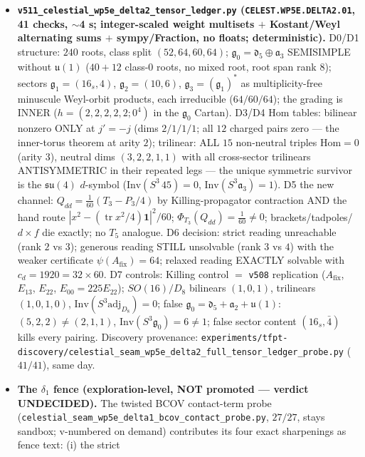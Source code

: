 \documentclass[11pt]{article}
\begin{document}
\begin{itemize}[leftmargin=1.5em]
\item \textbf{\texttt{v511\_celestial\_wp5e\_delta2\_tensor\_ledger.py} (\texttt{CELEST.WP5E.DELTA2.01},
41 checks, $\sim$4 s; integer-scaled weight multisets $+$ Kostant/Weyl alternating sums $+$
sympy/Fraction, no floats; deterministic).} D0/D1 structure: $240$ roots, class split
$(52,64,60,64)$; $\mathfrak g_0=\mathfrak d_5\oplus\mathfrak a_3$ SEMISIMPLE without
$\mathfrak u(1)$ ($40{+}12$ class-$0$ roots, no mixed root, root span rank $8$); sectors
$\mathfrak g_1=(16_s,4)$, $\mathfrak g_2=(10,6)$, $\mathfrak g_3=(\mathfrak g_1)^*$ as
multiplicity-free minuscule Weyl-orbit products, each irreducible ($64/60/64$); the grading is
INNER ($h=(2,2,2,2,2;0^4)$ in the $\mathfrak g_0$ Cartan). D3/D4 Hom tables: bilinear nonzero
ONLY at $j'=-j$ (dims $2/1/1/1$; all $12$ charged pairs zero --- the inner-torus theorem at
arity $2$); trilinear: ALL $15$ non-neutral triples $\mathrm{Hom}=0$ (arity $3$), neutral dims
$(3,2,2,1,1)$ with all cross-sector trilinears ANTISYMMETRIC in their repeated legs --- the
unique symmetric survivor is the $\mathfrak{su}(4)$ $d$-symbol ($\mathrm{Inv}(S^3\,45)=0$,
$\mathrm{Inv}(S^3\mathfrak a_3)=1$). D5 the new channel: $Q_{dd}=\tfrac1{60}(T_3-P_3/4)$ by
Killing-propagator contraction AND the hand route $|x^2-(\operatorname{tr}x^2/4)\mathbf 1|^2/60$;
$\Phi_{T_3}(Q_{dd})=\tfrac1{60}\neq0$; brackets/tadpoles/$d{\times}f$ die exactly; no $T_5$
analogue. D6 decision: strict reading unreachable (rank $2$ vs $3$); generous reading STILL
unsolvable (rank $3$ vs $4$) with the weaker certificate $\psi(A_{\mathrm{fix}})=64$; relaxed
reading EXACTLY solvable with $c_d=1920=32\times60$. D7 controls: Killing control $=$
\texttt{v508} replication ($A_{\mathrm{fix}}$, $E_{13}$, $E_{22}$, $E_{00}=225E_{22}$);
$SO(16)/D_8$ bilinears $(1,0,1)$, trilinears $(1,0,1,0)$, $\mathrm{Inv}(S^3\mathrm{adj}_{D_8})=0$;
false $\mathfrak g_0=\mathfrak d_5{+}\mathfrak a_2{+}\mathfrak u(1)$: $(5,2,2)\neq(2,1,1)$,
$\mathrm{Inv}(S^3\mathfrak g_0)=6\neq1$; false sector content $(16_s,\bar4)$ kills every pairing.
Discovery provenance:
\texttt{experiments/tfpt-discovery/celestial\_seam\_wp5e\_delta2\_full\_tensor\_ledger\_probe.py}
($41/41$), same day.
\item \textbf{The $\delta_1$ fence (exploration-level, NOT promoted --- verdict UNDECIDED).} The
twisted BCOV contact-term probe
(\texttt{celestial\_seam\_wp5e\_delta1\_bcov\_contact\_probe.py}, $27/27$, stays sandbox;
v-numbered on demand) contributes its four exact sharpenings as fence text: (i) the strict

\end{itemize}
\end{document}
